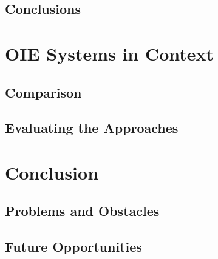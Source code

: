 \documentclass[11pt]{beamer}
\begin{document}
	\subsection{Conclusions}
\section{OIE Systems in Context}
	\subsection{Comparison}
	\subsection{Evaluating the Approaches}
\section{Conclusion}
	\subsection{Problems and Obstacles}
	\subsection{Future Opportunities}
\end{document}
